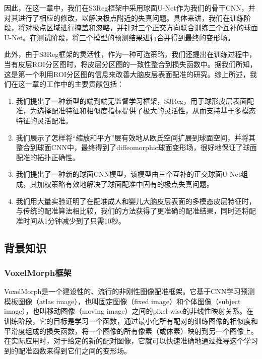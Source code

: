 因此，在这一章中，我们在S3Reg框架中采用球面U-Net作为我们的骨干CNN，并对其进行了相应的修改，以解决极点附近的失真问题。具体来讲，我们在训练阶段，将对极点区域进行掩盖和忽略，并针对三个正交方向联合训练三个互补的球面U-Net。在测试阶段，将三个模型的预测结果进行合并得到最终的变形场。

此外，由于S3Reg框架的灵活性，作为一种可选策略，我们还提出在训练过程中，当有皮层ROI分区图时，将皮层分区图的一致性整合到损失函数中。据我们所知，这是第一个利用ROI分区图的信息来改善大脑皮层表面配准的研究。综上所述，我们在这一章的工作中的主要贡献包括：

\begin{enumerate}
	\item 我们提出了一种新型的端到端无监督学习框架，S3Reg，用于球形皮层表面配准，为选择配准特征和相似度指标提供了极大的灵活性，从而支持基于多模态特征的灵活配准。
	\item 我们展示了怎样将“缩放和平方”层有效地从欧氏空间扩展到球面空间，并将其整合到球面CNN中，最终得到了diffeomorphic球面变形场，很好地保证了球面配准的拓扑正确性。
	\item 我们提出了一种新的球面CNN模型，该模型由三个互补的正交球面U-Net组成，其加权策略有效地解决了球面配准中固有的极点失真问题。
	\item 我们用大量实验证明了在配准成人和婴儿大脑皮层表面的多模态皮层特征时，与传统的配准算法相比较，我们的方法获得了更准确的配准结果，同时还将配准时间从1分钟减少到了只需10秒。
\end{enumerate}

\subsection{背景知识}
\subsubsection{VoxelMorph框架}
VoxelMorph\cite{balakrishnan2018unsupervised}是一个建设性的、流行的非刚性图像配准框架。它基于CNN学习预测模板图像（atlas image），也叫固定图像（fixed image）和个体图像（subject image），也叫移动图像（moving image）之间的pixel-wise的非线性映射关系。在训练阶段，它的目标是学习一个函数，通过最小化所有配对的训练图像的相似度和平滑度组成的损失函数，将一个图像的所有像素（或体素）映射到另一个图像上。在实际应用时，对于给定的新的配对图像，它就可以快速准确地通过推导这个学习到的配准函数来得到它们之间的变形场。

